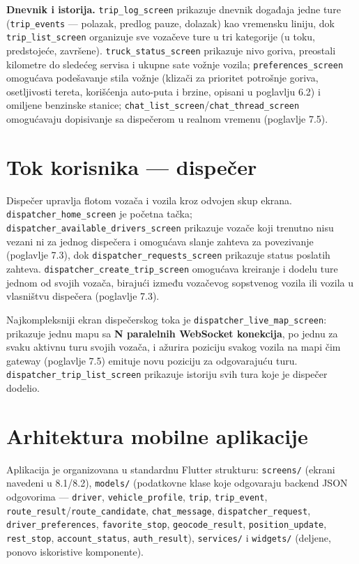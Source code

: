 \textbf{Dnevnik i istorija.} \texttt{trip\_log\_screen} prikazuje dnevnik događaja jedne ture (\texttt{trip\_events} — polazak, predlog pauze, dolazak) kao vremensku liniju, dok \texttt{trip\_list\_screen} organizuje sve vozačeve ture u tri kategorije (u toku, predstojeće, završene). \texttt{truck\_status\_screen} prikazuje nivo goriva, preostali kilometre do sledećeg servisa i ukupne sate vožnje vozila; \texttt{preferences\_screen} omogućava podešavanje stila vožnje (klizači za prioritet potrošnje goriva, osetljivosti tereta, korišćenja auto-puta i brzine, opisani u poglavlju 6.2) i omiljene benzinske stanice; \texttt{chat\_list\_screen}/\texttt{chat\_thread\_screen} omogućavaju dopisivanje sa dispečerom u realnom vremenu (poglavlje 7.5).

\section{Tok korisnika — dispečer}

Dispečer upravlja flotom vozača i vozila kroz odvojen skup ekrana. \texttt{dispatcher\_home\_screen} je početna tačka; \texttt{dispatcher\_available\_drivers\_screen} prikazuje vozače koji trenutno nisu vezani ni za jednog dispečera i omogućava slanje zahteva za povezivanje (poglavlje 7.3), dok \texttt{dispatcher\_requests\_screen} prikazuje status poslatih zahteva. \texttt{dispatcher\_create\_trip\_screen} omogućava kreiranje i dodelu ture jednom od svojih vozača, birajući između vozačevog sopstvenog vozila ili vozila u vlasništvu dispečera (poglavlje 7.3).

Najkompleksniji ekran dispečerskog toka je \texttt{dispatcher\_live\_map\_screen}: prikazuje jednu mapu sa \textbf{N paralelnih WebSocket konekcija}, po jednu za svaku aktivnu turu svojih vozača, i ažurira poziciju svakog vozila na mapi čim gateway (poglavlje 7.5) emituje novu poziciju za odgovarajuću turu. \texttt{dispatcher\_trip\_list\_screen} prikazuje istoriju svih tura koje je dispečer dodelio.

\section{Arhitektura mobilne aplikacije}

Aplikacija je organizovana u standardnu Flutter strukturu: \texttt{screens/} (ekrani navedeni u 8.1/8.2), \texttt{models/} (podatkovne klase koje odgovaraju backend JSON odgovorima — \texttt{driver}, \texttt{vehicle\_profile}, \texttt{trip}, \texttt{trip\_event}, \texttt{route\_result}/\texttt{route\_candidate}, \texttt{chat\_message}, \texttt{dispatcher\_request}, \texttt{driver\_preferences}, \texttt{favorite\_stop}, \texttt{geocode\_result}, \texttt{position\_update}, \texttt{rest\_stop}, \texttt{account\_status}, \texttt{auth\_result}), \texttt{services/} i \texttt{widgets/} (deljene, ponovo iskoristive komponente).


